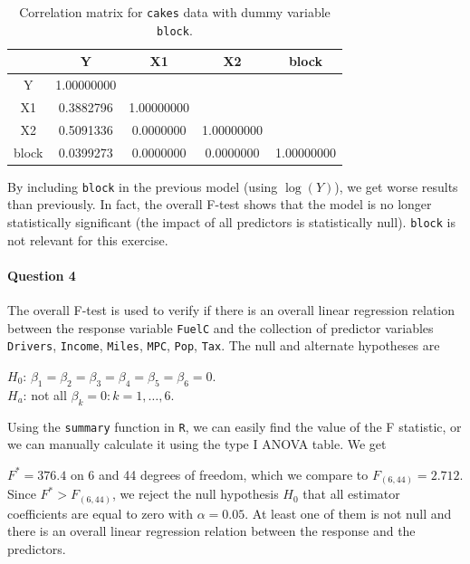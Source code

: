 \documentclass[]{article}
\let\oldparagraph\paragraph
\renewcommand{\paragraph}[1]{\oldparagraph{#1}\mbox{}}
\begin{document}
\begin{table}[!ht]
\centering
\caption{Correlation matrix for \texttt{cakes} data with dummy variable \texttt{block}.}
\begin{tabular}{c|c|c|c|c|}
       &       Y      &       X1     &       X2      &       block   \\
\hline
 Y     &  1.00000000  &              &               &                \\
 X1    &  0.3882796   &  1.00000000  &               &                \\
 X2    &  0.5091336   &  0.0000000   &   1.00000000  &                \\
 block &  0.0399273   &  0.0000000   &   0.0000000   &   1.00000000   \\
\end{tabular}
\label{q3_2}
\end{table}

By including \texttt{block} in the previous model (using $\log{(Y)}$), we get worse results than previously. In fact, the overall F-test shows that the model is no longer statistically significant (the impact of all predictors is statistically null). \texttt{block} is not relevant for this exercise.

\paragraph{\Large Question 4}\normalsize

The overall F-test is used to verify if there is an overall linear regression relation between the response variable \texttt{FuelC} and the collection of predictor variables \texttt{Drivers}, \texttt{Income}, \texttt{Miles}, \texttt{MPC}, \texttt{Pop}, \texttt{Tax}. The null and alternate hypotheses are

$H_0$: $\beta_1 = \beta_2 = \beta_3 = \beta_4 = \beta_5 = \beta_6 = 0$.\\
$H_a$: not all $\beta_k = 0: k = 1, \ldots, 6$.

Using the \texttt{summary} function in \texttt{R}, we can easily find the value of the F statistic, or we can manually calculate it using the type I ANOVA table. We get

$F^* = 376.4$ on 6 and 44 degrees of freedom, which we compare to $F_{(6, 44)} = 2.712$. Since $F^* > F_{(6, 44)}$, we reject the null hypothesis $H_0$ that all estimator coefficients are equal to zero with $\alpha = 0.05$. At least one of them is not null and there is an overall linear regression relation between the response and the predictors.
\end{document}
